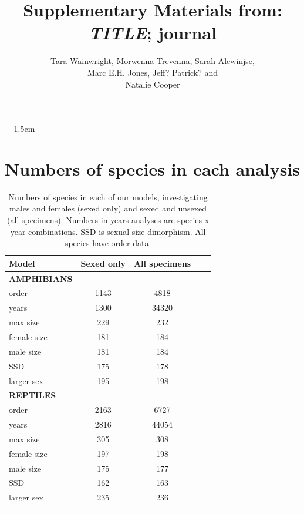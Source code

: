 \documentclass[a4paper, 12pt]{article}
\title{Supplementary Materials from: \textit{TITLE}; journal}
\author{Tara Wainwright, 
  Morwenna Trevenna, 
  Sarah Alewinjse,\\ 
  Marc E.H. Jones, 
  Jeff? 
  Patrick? and\\
  Natalie Cooper}
\date{}
\begin{document}
\maketitle

\tableofcontents

\parindent = 1.5em
\addtolength{\parskip}{.3em}

\newpage
\section{Numbers of species in each analysis}
\begin{table}[H]
\centering
\begin{tabular}{lcccc}

  \hline
  \textbf{Model} & \textbf{Sexed only} & \textbf{All specimens}\\ 
  \hline
  \textbf{AMPHIBIANS} & &\\
  \hline
  order & 1143 & 4818\\
  years & 1300 & 34320\\
  max size & 229 & 232\\
  female size & 181 & 184\\
  male size & 181 & 184\\
  SSD & 175 & 178\\
  larger sex & 195 & 198\\
  \hline
  \textbf{REPTILES} & &\\
  \hline
  order & 2163 & 6727\\
  years & 2816 & 44054\\
  max size & 305 & 308\\
  female size & 197 & 198\\
  male size & 175 & 177\\
  SSD & 162 & 163\\
  larger sex & 235 & 236\\
  \hline

\label{table_numbers}
\end{tabular}
\caption{Numbers of species in each of our models, investigating males and females (sexed only) and sexed and unsexed (all specimens). Numbers in years analyses are species x year combinations. SSD is sexual size dimorphism. All species have order data.} 

\end{table}
\end{document}
